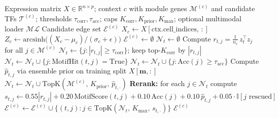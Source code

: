 \documentclass{article}
\newcommand{\TopK}{\mathrm{TopK}}
\begin{document}
\begin{algorithm}[H]
\caption{TF-Neighborhood Candidate Generation}
\label{alg:candidates}
\begin{algorithmic}[1]
\Require Expression matrix $X \in \mathbb{R}^{n \times p}$;
         context $c$ with module genes $\mathcal{M}^{(c)}$ and candidate TFs $\mathcal{T}^{(c)}$;
         thresholds $\tau_{\mathrm{corr}}, \tau_{\mathrm{acc}}$;
         caps $K_{\mathrm{corr}}, K_{\mathrm{prior}}, K_{\max}$;
         optional multimodal loader $\mathcal{ML}$
\Ensure  Candidate edge set $\mathcal{E}^{(c)}$
\State $X_c \leftarrow X[\text{ctx.cell\_indices},\, :]$
\State $Z_c \leftarrow \mathrm{arcsinh}\bigl((X_c - \mu_c) / (\sigma_c + \epsilon)\bigr)$
\State $\mathcal{E}^{(c)} \leftarrow \emptyset$
  \State $\mathcal{N}_t \leftarrow \emptyset$
  \State Compute $r_{t,j} = \tfrac{1}{n_c}\, z_t^{\top} z_j$ for all $j \in \mathcal{M}^{(c)}$
  \State $\mathcal{N}_t \leftarrow \{j : |r_{t,j}| \ge \tau_{\mathrm{corr}}\}$; keep top-$K_{\mathrm{corr}}$ by $|r_{t,j}|$
    \State $\mathcal{N}_t \leftarrow \mathcal{N}_t \cup \{j : \mathrm{MotifHit}(t,j) = \mathrm{True}\}$
  \EndIf
    \State $\mathcal{N}_t \leftarrow \mathcal{N}_t \cup \{j : \mathrm{Acc}(j) \ge \tau_{\mathrm{acc}}\}$
  \EndIf
    \State Compute $\hat{p}_{t,j}$ via ensemble prior on training split $X[\mathbf{m},:]$
    \State $\mathcal{N}_t \leftarrow \mathcal{N}_t \cup \TopK(\mathcal{M}^{(c)},\, K_{\mathrm{prior}},\, \hat{p}_{t,\cdot})$
  \EndIf
  \State \textbf{Rerank:} for each $j \in \mathcal{N}_t$ compute
  \Statex \quad $s_{t,j} \leftarrow 0.55|r_{t,j}| + 0.20\,\mathrm{MotifScore}(t,j) + 0.10\,\mathrm{Acc}(j) + 0.10\,\hat{p}_{t,j} + 0.05\cdot\mathbb{I}[\text{$j$ rescued}]$
  \State $\mathcal{E}^{(c)} \leftarrow \mathcal{E}^{(c)} \cup \{(t,j) : j \in \TopK(\mathcal{N}_t,\, K_{\max},\, s_{t,\cdot})\}$
\EndFor
\State \Return $\mathcal{E}^{(c)}$
\end{algorithmic}
\end{algorithm}
\end{document}

